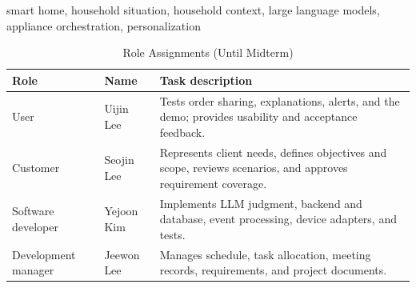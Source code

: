 \documentclass[conference]{IEEEtran}
\begin{document}
\begin{abstract}
Online delivery brings products to the door, but it does not prepare the home for what those products require or for a household situation that the order may indicate. Users must still decide how unfamiliar food, clothing, and furniture should be handled and must separately coordinate appliances before occasions such as a child's birthday party. We propose \emph{Settle}, a purchase-aware household orchestration service that converts a shared order into a bounded household episode. Settle extracts items from an order image, attaches relevant calendar and household context, identifies item-level support needs and action-relevant household situations, derives household needs and feasible appliance and Internet-of-Things tasks, and executes only code-verified actions within current authorization and safety boundaries. Explicit user feedback and bounded observations inform household memory. The system is intentionally quiet: no action is a valid result, initial preparation plans require plan-level authorization, and repeated confirmation of similar situations may allow later preparation with fewer questions. Every automation remains explainable and overrideable. The initial prototype will demonstrate a child's birthday-party episode using real devices and clearly labeled simulations. This document defines the responsibilities and boundaries that later specification, architecture, implementation, and evaluation must satisfy.
\end{abstract}

\begin{IEEEkeywords}
smart home, household situation, household context, large language models, appliance orchestration, personalization
\end{IEEEkeywords}

\begin{table}[!t]
\caption{Role Assignments (Until Midterm)}
\label{tab:roles}
\centering
\footnotesize
\renewcommand{\arraystretch}{1.12}
\begin{tabularx}{\columnwidth}{@{}>{\raggedright\arraybackslash}p{}>{\raggedright\arraybackslash}p{}>{\raggedright\arraybackslash}X@{}}
\toprule
\textbf{Role} & \textbf{Name} & \textbf{Task description}\\
\midrule
User & Uijin Lee & Tests order sharing, explanations, alerts, and the demo; provides usability and acceptance feedback.\\
Customer & Seojin Lee & Represents client needs, defines objectives and scope, reviews scenarios, and approves requirement coverage.\\
Software developer & Yejoon Kim & Implements LLM judgment, backend and database, event processing, device adapters, and tests.\\
Development manager & Jeewon Lee & Manages schedule, task allocation, meeting records, requirements, and project documents.\\
\bottomrule
\end{tabularx}
\end{table}
\end{document}

